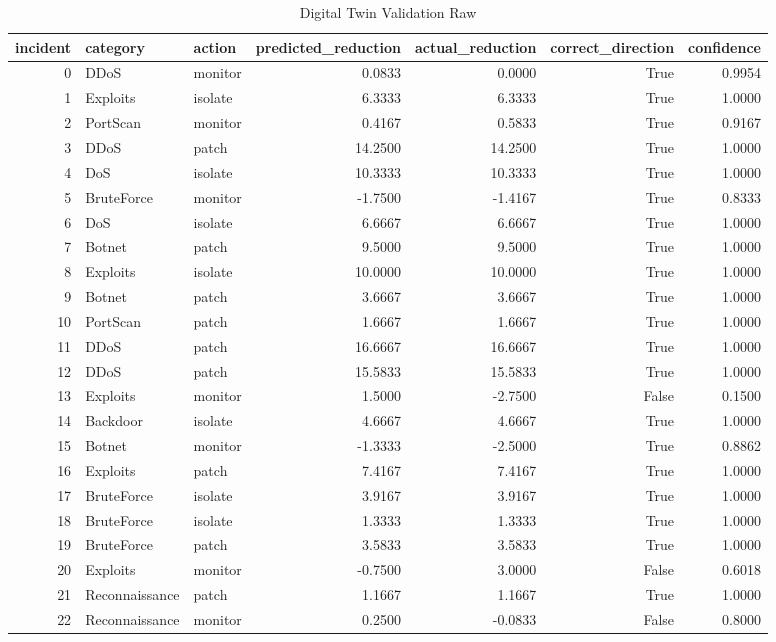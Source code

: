 \begin{table}
\caption{Digital Twin Validation Raw}
\label{tab:digital_twin_validation_raw}
\begin{tabular}{rllrrrr}
\toprule
incident & category & action & predicted_reduction & actual_reduction & correct_direction & confidence \\
\midrule
0 & DDoS & monitor & 0.0833 & 0.0000 & True & 0.9954 \\
1 & Exploits & isolate & 6.3333 & 6.3333 & True & 1.0000 \\
2 & PortScan & monitor & 0.4167 & 0.5833 & True & 0.9167 \\
3 & DDoS & patch & 14.2500 & 14.2500 & True & 1.0000 \\
4 & DoS & isolate & 10.3333 & 10.3333 & True & 1.0000 \\
5 & BruteForce & monitor & -1.7500 & -1.4167 & True & 0.8333 \\
6 & DoS & isolate & 6.6667 & 6.6667 & True & 1.0000 \\
7 & Botnet & patch & 9.5000 & 9.5000 & True & 1.0000 \\
8 & Exploits & isolate & 10.0000 & 10.0000 & True & 1.0000 \\
9 & Botnet & patch & 3.6667 & 3.6667 & True & 1.0000 \\
10 & PortScan & patch & 1.6667 & 1.6667 & True & 1.0000 \\
11 & DDoS & patch & 16.6667 & 16.6667 & True & 1.0000 \\
12 & DDoS & patch & 15.5833 & 15.5833 & True & 1.0000 \\
13 & Exploits & monitor & 1.5000 & -2.7500 & False & 0.1500 \\
14 & Backdoor & isolate & 4.6667 & 4.6667 & True & 1.0000 \\
15 & Botnet & monitor & -1.3333 & -2.5000 & True & 0.8862 \\
16 & Exploits & patch & 7.4167 & 7.4167 & True & 1.0000 \\
17 & BruteForce & isolate & 3.9167 & 3.9167 & True & 1.0000 \\
18 & BruteForce & isolate & 1.3333 & 1.3333 & True & 1.0000 \\
19 & BruteForce & patch & 3.5833 & 3.5833 & True & 1.0000 \\
20 & Exploits & monitor & -0.7500 & 3.0000 & False & 0.6018 \\
21 & Reconnaissance & patch & 1.1667 & 1.1667 & True & 1.0000 \\
22 & Reconnaissance & monitor & 0.2500 & -0.0833 & False & 0.8000 \\

\end{tabular}
\end{table}

